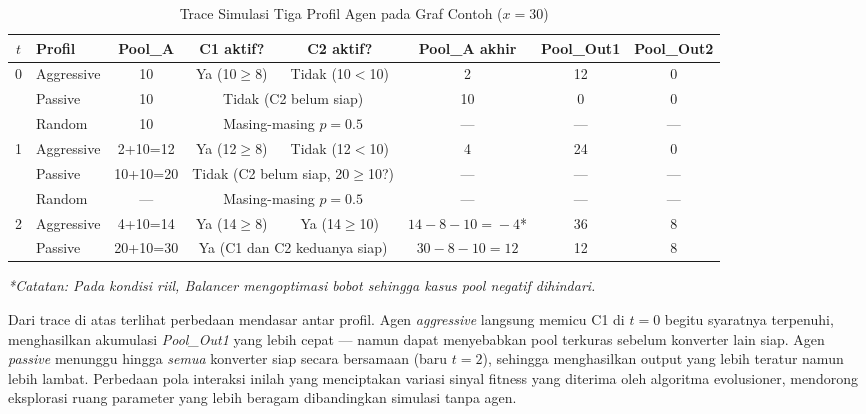 \begin{table}[htbp]
\centering
\caption{Trace Simulasi Tiga Profil Agen pada Graf Contoh ($x = 30$)}
\label{tab:agent_trace}
\begin{adjustbox}{max width=\textwidth}
\begin{tabular}{clcccccc}
\hline
$t$ & \textbf{Profil} & \textbf{Pool\_A} & \textbf{C1 aktif?} & \textbf{C2 aktif?} & \textbf{Pool\_A akhir} & \textbf{Pool\_Out1} & \textbf{Pool\_Out2} \\
\hline
\multirow{3}{*}{0} & Aggressive & 10 & Ya (10$\geq$8)  & Tidak (10$<$10) & 2  & 12 & 0  \\
                   & Passive    & 10 & \multicolumn{2}{c}{Tidak (C2 belum siap)} & 10 & 0  & 0  \\
                   & Random     & 10 & \multicolumn{2}{c}{Masing-masing $p=0.5$} & —  & —  & —  \\
\hline
\multirow{3}{*}{1} & Aggressive & 2+10=12  & Ya (12$\geq$8) & Tidak (12$<$10) & 4  & 24 & 0  \\
                   & Passive    & 10+10=20 & \multicolumn{2}{c}{Tidak (C2 belum siap, 20$\geq$10?)} & — & — & — \\
                   & Random     & —        & \multicolumn{2}{c}{Masing-masing $p=0.5$} & — & — & — \\
\hline
\multirow{2}{*}{2} & Aggressive & 4+10=14  & Ya (14$\geq$8) & Ya (14$\geq$10) & $14{-}8{-}10=\!-4$* & 36 & 8 \\
                   & Passive    & 20+10=30 & \multicolumn{2}{c}{Ya (C1 dan C2 keduanya siap)} & $30{-}8{-}10=12$ & 12 & 8 \\
\hline
\end{tabular}
\end{adjustbox}
\end{table}

\textit{*Catatan: Pada kondisi riil, Balancer mengoptimasi bobot sehingga kasus pool negatif dihindari.}

Dari trace di atas terlihat perbedaan mendasar antar profil. Agen \textit{aggressive} langsung memicu C1 di $t=0$ begitu syaratnya terpenuhi, menghasilkan akumulasi \textit{Pool\_Out1} yang lebih cepat — namun dapat menyebabkan pool terkuras sebelum konverter lain siap. Agen \textit{passive} menunggu hingga \textit{semua} konverter siap secara bersamaan (baru $t=2$), sehingga menghasilkan output yang lebih teratur namun lebih lambat. Perbedaan pola interaksi inilah yang menciptakan variasi sinyal fitness yang diterima oleh algoritma evolusioner, mendorong eksplorasi ruang parameter yang lebih beragam dibandingkan simulasi tanpa agen.


